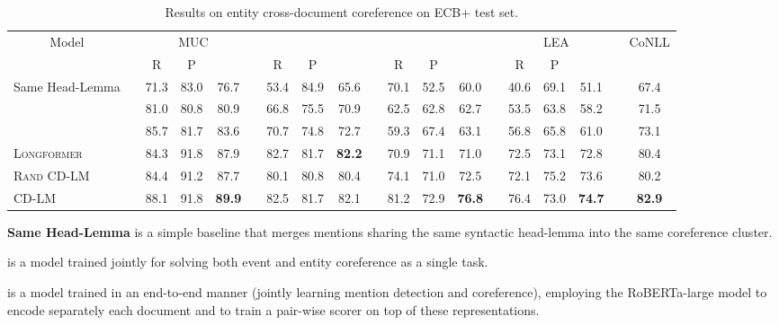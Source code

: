 \documentclass[11pt,a4paper]{article}
\begin{document}
\begin{table*}[!ht]
    \centering
        \small
    \begin{tabular}{@{}lcccccccccccccccclc@{}}
    \toprule
    \multicolumn{1}{c}{Model}&\phantom{abcd}& \multicolumn{3}{c}{MUC} && \multicolumn{3}{c}{} & & \multicolumn{3}{c}{} && \multicolumn{3}{c}{LEA} && CoNLL\\
    \cmidrule{3-5} \cmidrule{7-9} \cmidrule{11-13} \cmidrule{15-17} \cmidrule{19-19}
    && R & P &  && R & P &  && R &P &  && R &P &  &&   \\ 
    \midrule
        Same Head-Lemma &&   71.3 & 83.0 & 76.7 && 53.4 & 84.9 & 65.6 && 70.1 & 52.5 & 60.0 && 40.6 & 69.1 & 51.1 && 67.4\\
        \citet{barhom-etal-2019-revisiting} &&  81.0 & 80.8 & 80.9 && 66.8 & 75.5 & 70.9 && 62.5 & 62.8 & 62.7 && 53.5 & 63.8 & 58.2 && 71.5\\
        \citet{Cattan2020StreamliningCC} &&  85.7 & 81.7 & 83.6 && 70.7 & 74.8 & 72.7 && 59.3 & 67.4 & 63.1 && 56.8 & 65.8 & 61.0 && 73.1\\
        \midrule
        \textsc{Longformer} && 84.3  & 91.8 & 87.9 &&  82.7 & 81.7  & \textbf{82.2} &&  70.9 & 71.1   & 71.0  &&  72.5 & 73.1  & 72.8 && 80.4 \\
        \textsc{Rand CD-LM} &&  84.4  & 91.2  & 87.7 &&  80.1 & 80.8  & 80.4 &&  74.1 & 71.0  & 72.5 && 72.1 & 75.2  & 73.6 && 80.2\\
        \textsc{CD-LM} && 88.1  & 91.8 &\textbf{89.9} && 82.5 & 81.7 & 82.1 && 81.2 & 72.9 & \textbf{76.8} && 76.4 & 73.0 & \textbf{74.7} && \textbf{82.9} \\

    \bottomrule
    \end{tabular}
    \caption{Results on entity cross-document coreference on ECB+ test set.}
    \label{tab:subtopic_results_entity}
    \vspace{-3mm}
\end{table*} 

{\bf Same Head-Lemma} is a simple baseline that merges mentions sharing the same syntactic head-lemma into the same coreference cluster.

{\citet{barhom-etal-2019-revisiting}} is a model trained jointly for solving both event and entity coreference as a single task. 

{\citet{Cattan2020StreamliningCC}} is a model trained in an end-to-end manner (jointly learning mention detection and coreference), employing the RoBERTa-large model to encode separately each document and to train a pair-wise scorer on top of these representations. 
\end{document}
